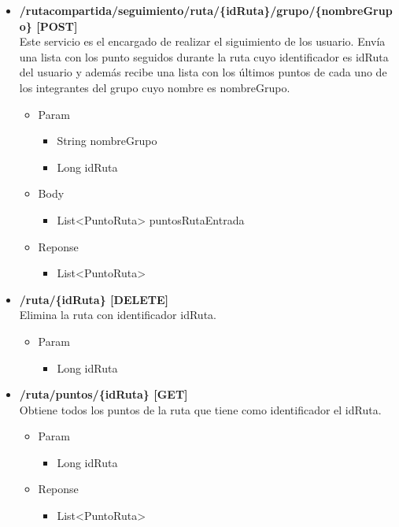 \begin{itemize}
\begin{itemize}
\item  \textbf{/rutacompartida/seguimiento/ruta/\{idRuta\}/grupo/\{nombreGrupo\} [POST]}\\
Este servicio es el encargado de realizar el siguimiento de los usuario. Envía una lista con los punto seguidos durante la ruta cuyo identificador es idRuta del usuario y además recibe una lista con los últimos puntos de cada uno de los integrantes del grupo cuyo nombre es nombreGrupo.
\begin{itemize}
\item Param
\begin{itemize}
\item String nombreGrupo
\item Long idRuta
\end{itemize}
\item Body
\begin{itemize}
\item List<PuntoRuta> puntosRutaEntrada
\end{itemize}
\item Reponse
\begin{itemize}
\item List<PuntoRuta>
\end{itemize}
\end{itemize}
\end{itemize}


\begin{itemize}
\item  \textbf{/ruta/\{idRuta\} [DELETE]}\\
Elimina la ruta con identificador idRuta.
\begin{itemize}
\item Param
\begin{itemize}
\item Long idRuta
\end{itemize}
\end{itemize}
\end{itemize}



\begin{itemize}
\item  \textbf{/ruta/puntos/\{idRuta\} [GET]}\\
Obtiene todos los puntos de la ruta que tiene como identificador el idRuta.
\begin{itemize}
\item Param
\begin{itemize}
\item Long idRuta
\end{itemize}
\item Reponse
\begin{itemize}
\item List<PuntoRuta>
\end{itemize}
\end{itemize}
\end{itemize}







\end{itemize}
